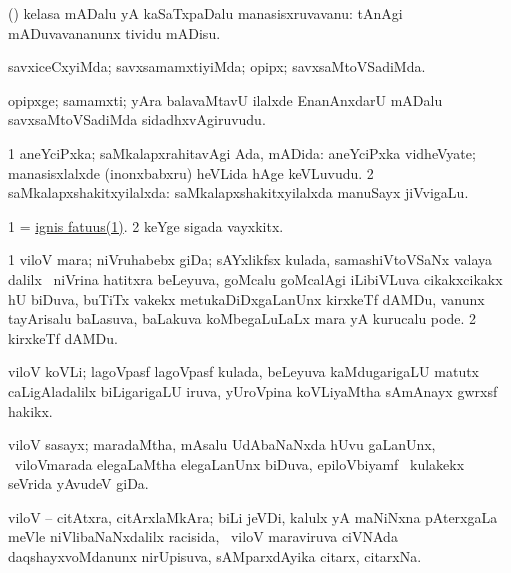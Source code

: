 \noindent
\gl{\pagu}
\bmng
{} (\rUpa) kelasa mADalu yA kaSaTxpaDalu manasisxruvavanu:  tAnAgi mADuvavananunx tividu mADisu. 
\emng
\eentry

\bentry
{}
\gl{\kirxvi}
\bmng
savxiceCxyiMda; savxsamamxtiyiMda; opipx; savxsaMtoVSadiMda. 
\emng
\eentry

\bentry
{}
\gl{\nA}
\bmng
opipxge; samamxti; yAra balavaMtavU ilalxde EnanAnxdarU mADalu savxsaMtoVSadiMda sidadhxvAgiruvudu. 
\emng
\eentry

\bentry
{} 
\gl{\gu}
\expl{}
\bmng
\bnum
\num{1} aneYciPxka; saMkalapxrahitavAgi Ada, mADida:  aneYciPxka vidheVyate; manasisxlalxde (inonxbabxru) heVLida hAge keVLuvudu. 
\num{2} saMkalapxshakitxyilalxda:  saMkalapxshakitxyilalxda manuSayx jiVvigaLu. 
\enum
\emng
\eentry

\bentry
{} 
\gl{\nA}
\expl{}
\bmng
\bnum
\num{1} = \hyperref{kandict_i.pdf}{I}{ignis fatuus(1)}{ignis fatuus(1)}. 
\num{2} keYge sigada vayxkitx. 
\enum
\emng
\eentry

\bentry
{}
\gl{\nA}
\bmng
\bnum
\num{1} viloV mara; niVruhabebx giDa; sAYxlikfsx kulada, samashiVtoVSaNx valaya dalilx \sA\ niVrina hatitxra beLeyuva, goMcalu goMcalAgi iLibiVLuva cikakxcikakx hU biDuva, buTiTx \mo vakekx metukaDiDxgaLanUnx kirxkeTf dAMDu, \mo vanunx tayArisalu baLasuva, baLakuva koMbegaLuLaLx mara yA kurucalu pode. 
\num{2} kirxkeTf dAMDu. 
\enum
\emng
\eentry

\bentry
{}
\gl{\nA}
\bmng
{viloV koVLi; lagoVpasf lagoVpasf kulada, beLeyuva kaMdugarigaLU matutx caLigAladalilx biLigarigaLU iruva, yUroVpina koVLiyaMtha sAmAnayx gwrxsf hakikx.} 
\emng
\eentry

\bentry
{}
\gl{\nA}
\bmng
viloV sasayx; maradaMtha, mAsalu UdAbaNaNxda hUvu gaLanUnx, \kanmu\ viloVmarada elegaLaMtha elegaLanUnx biDuva, epiloVbiyamf \mo\ kulakekx seVrida yAvudeV giDa. 
\emng
\eentry

\bentry
{}
\gl{\nA}
\bmng
viloV -- citAtxra, citArxlaMkAra; biLi jeVDi, kalulx yA maNiNxna pAterxgaLa meVle niVlibaNaNxdalilx racisida, \sA\ viloV maraviruva ciVNAda daqshayxvoMdanunx nirUpisuva, sAMparxdAyika citarx, citarxNa. 
\emng
\eentry

